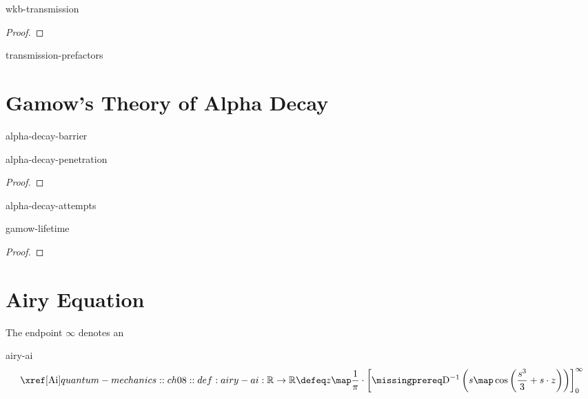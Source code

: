 \documentclass[12pt]{article}
\begin{document}
\begin{thm}{wkb-transmission}
  \todo
\end{thm}

\begin{proof}
  \todo
\end{proof}

\begin{rem}{transmission-prefactors}
  \todo
\end{rem}

\section{Gamow's Theory of Alpha Decay}

\begin{rem}{alpha-decay-barrier}
  \todo
\end{rem}

\begin{thm}{alpha-decay-penetration}
  \todo
\end{thm}

\begin{proof}
  \todo
\end{proof}

\begin{rem}{alpha-decay-attempts}
  \todo
\end{rem}

\begin{thm}{gamow-lifetime}
  \todo
\end{thm}

\begin{proof}
  \todo
\end{proof}

\section{Airy Equation}

The endpoint $\infty$ denotes an 

\begin{dfn}{airy-ai}
  \[
    \AiryAi:\mathbb R\to\mathbb R\defeq z\map
    \frac1\pi\cdot\left[\DiffOp^{-1}\left(s\map
      \cos\left(\frac{s^3}{3}+s\cdot z\right)
    \right)\right]_0^\infty
  \]
\end{dfn}
\end{document}
